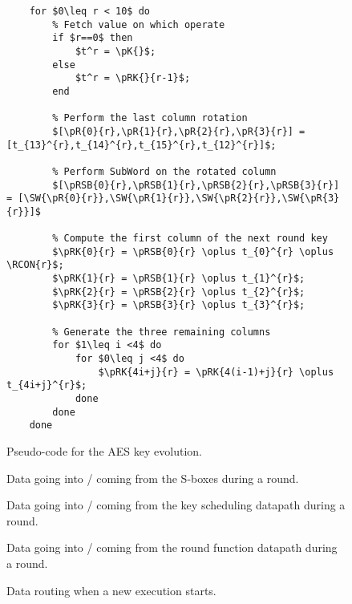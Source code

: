 \documentclass{scrartcl}
\begin{document}
\begin{figure}
    \begin{lstlisting}[frame=single]
    %%% Key evolution for each round key 
    for $0\leq r < 10$ do
        % Fetch value on which operate
        if $r==0$ then
            $t^r = \pK{}$; 
        else 
            $t^r = \pRK{}{r-1}$;
        end

        % Perform the last column rotation
        $[\pR{0}{r},\pR{1}{r},\pR{2}{r},\pR{3}{r}] = [t_{13}^{r},t_{14}^{r},t_{15}^{r},t_{12}^{r}]$; 

        % Perform SubWord on the rotated column
        $[\pRSB{0}{r},\pRSB{1}{r},\pRSB{2}{r},\pRSB{3}{r}] = [\SW{\pR{0}{r}},\SW{\pR{1}{r}},\SW{\pR{2}{r}},\SW{\pR{3}{r}}]$

        % Compute the first column of the next round key
        $\pRK{0}{r} = \pRSB{0}{r} \oplus t_{0}^{r} \oplus \RCON{r}$;
        $\pRK{1}{r} = \pRSB{1}{r} \oplus t_{1}^{r}$;
        $\pRK{2}{r} = \pRSB{2}{r} \oplus t_{2}^{r}$;
        $\pRK{3}{r} = \pRSB{3}{r} \oplus t_{3}^{r}$;

        % Generate the three remaining columns
        for $1\leq i <4$ do
            for $0\leq j <4$ do
                $\pRK{4i+j}{r} = \pRK{4(i-1)+j}{r} \oplus t_{4i+j}^{r}$;
            done
        done
    done
    \end{lstlisting}
    \caption{Pseudo-code for the AES key evolution.}
    \label{fig:code_key}
\end{figure}

\begin{figure}
    \centering
    
    \caption{Data going into / coming from the S-boxes during a round.}
    \label{fig:pipe_sbox}
\end{figure}

\begin{figure}
    \centering
    
    \caption{Data going into / coming from the key scheduling datapath during a round.}
    \label{fig:pipe_dpkey}
\end{figure}

\begin{figure}
    \centering
    
    \caption{Data going into / coming from the round function datapath during a round.}
    \label{fig:pipe_dpstate}
\end{figure}

\begin{figure}
    \centering
     
    \caption{Data routing when a new execution starts.}
    \label{fig:time_first_round}
\end{figure}
\end{document}
